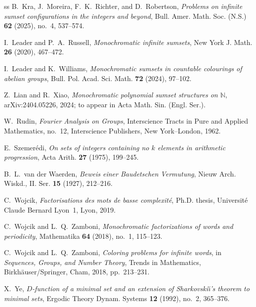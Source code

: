 \documentclass[reqno,12pt]{amsart}
\numberwithin{equation}{section}
\begin{document}
\begin{thebibliography}{ss}
B.~Kra, J.~Moreira, F.~K.~Richter, and D.~Robertson,
\emph{Problems on infinite sumset configurations in the integers
and beyond},
Bull. Amer. Math. Soc. (N.S.) \textbf{62} (2025), no.~4,
537--574.

I.~Leader and P.~A.~Russell,
\emph{Monochromatic infinite sumsets},
New York J. Math. \textbf{26} (2020), 467--472.

I.~Leader and K.~Williams,
\emph{Monochromatic sumsets in countable colourings of abelian groups},
Bull. Pol. Acad. Sci. Math. \textbf{72} (2024), 97--102.

Z.~Lian and R.~Xiao,
\emph{Monochromatic polynomial sumset structures on $\mathbb{N}$},
arXiv:2404.05226, 2024; to appear in
Acta Math. Sin. (Engl. Ser.).

W.~Rudin,
\emph{Fourier Analysis on Groups},
Interscience Tracts in Pure and Applied Mathematics, no.~12,
Interscience Publishers, New York--London, 1962.

E.~Szemer\'edi,
\emph{On sets of integers containing no $k$ elements in arithmetic
progression},
Acta Arith. \textbf{27} (1975), 199--245.

B.~L.~van der Waerden,
\emph{Beweis einer Baudetschen Vermutung},
Nieuw Arch. Wiskd., II. Ser. \textbf{15} (1927), 212--216.

C.~Wojcik,
\emph{Factorisations des mots de basse complexit\'e},
Ph.D. thesis, Universit\'e Claude Bernard Lyon~1, Lyon, 2019.

C.~Wojcik and L.~Q.~Zamboni,
\emph{Monochromatic factorizations of words and periodicity},
Mathematika \textbf{64} (2018), no.~1, 115--123.

C.~Wojcik and L.~Q.~Zamboni,
\emph{Coloring problems for infinite words},
in \emph{Sequences, Groups, and Number Theory},
Trends in Mathematics,
Birkh\"auser/Springer, Cham, 2018, pp.~213--231.

X.~Ye,
\emph{$D$-function of a minimal set and an extension of
Sharkovski\u{\i}'s theorem to minimal sets},
Ergodic Theory Dynam. Systems \textbf{12} (1992), no.~2, 365--376.

\end{thebibliography}
\end{document}
